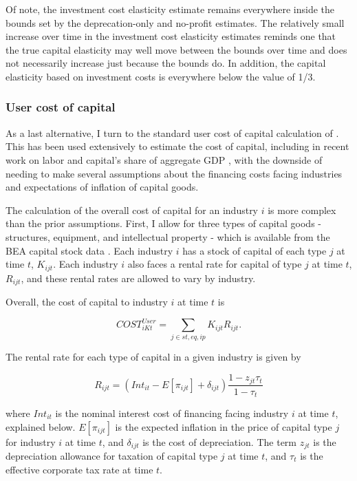 \documentclass[11pt]{article}
\begin{document}
Of note, the investment cost elasticity estimate remains everywhere inside the bounds set by the deprecation-only and no-profit estimates. The relatively small increase over time in the investment cost elasticity estimates reminds one that the true capital elasticity may well move between the bounds over time and does not necessarily increase just because the bounds do. In addition, the capital elasticity based on investment costs is everywhere below the value of 1/3.

\subsubsection{User cost of capital}\label{SEC_usercost}
As a last alternative, I turn to the standard user cost of capital calculation of \cite{halljorg1967}. This has been used extensively to estimate the cost of capital, including in recent work on labor and capital's share of aggregate GDP \citep{Barkai000}, with the downside of needing to make several assumptions about the financing costs facing industries and expectations of inflation of capital goods. 

The calculation of the overall cost of capital for an industry $i$ is more complex than the prior assumptions. First, I allow for three types of capital goods - structures, equipment, and intellectual property - which is available from the BEA capital stock data \citep{beacap,beagov}. Each industry $i$ has a stock of capital of each type $j$ at time $t$, $K_{ijt}$. Each industry $i$ also faces a rental rate for capital of type $j$ at time $t$, $R_{ijt}$, and these rental rates are allowed to vary by industry.

Overall, the cost of capital to industry $i$ at time $t$ is

\begin{equation}
	COST^{User}_{iKt} = \sum_{j \in st,eq,ip} K_{ijt} R_{ijt}.
\end{equation}

The rental rate for each type of capital in a given industry is given by

\begin{equation}
	R_{ijt} = (Int_{it} - E[\pi_{ijt}] + \delta_{ijt})\frac{1-z_{jt} \tau_t}{1-\tau_t}
\end{equation}

where $Int_{it}$ is the nominal interest cost of financing facing industry $i$ at time $t$, explained below. $E[\pi_{ijt}]$ is the expected inflation in the price of capital type $j$ for industry $i$ at time $t$, and $\delta_{ijt}$ is the cost of depreciation. The term $z_{jt}$ is the depreciation allowance for taxation of capital type $j$ at time $t$, and $\tau_t$ is the effective corporate tax rate at time $t$.
\end{document}
